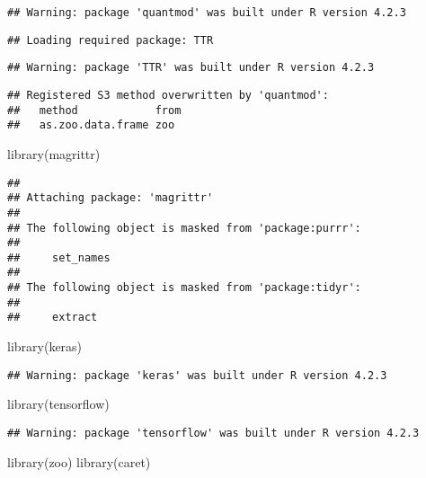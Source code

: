 \documentclass[
]{article}
\newenvironment{Shaded}{\begin{snugshade}}{\end{snugshade}}
\newcommand{\FunctionTok}[1]{\textcolor[rgb]{0.00,0.00,0.00}{#1}}
\newcommand{\NormalTok}[1]{#1}
\begin{document}
\begin{verbatim}
## Warning: package 'quantmod' was built under R version 4.2.3
\end{verbatim}

\begin{verbatim}
## Loading required package: TTR
\end{verbatim}

\begin{verbatim}
## Warning: package 'TTR' was built under R version 4.2.3
\end{verbatim}

\begin{verbatim}
## Registered S3 method overwritten by 'quantmod':
##   method            from
##   as.zoo.data.frame zoo
\end{verbatim}

\begin{Shaded}
\begin{Highlighting}[]
\FunctionTok{library}\NormalTok{(magrittr)}
\end{Highlighting}
\end{Shaded}

\begin{verbatim}
## 
## Attaching package: 'magrittr'
## 
## The following object is masked from 'package:purrr':
## 
##     set_names
## 
## The following object is masked from 'package:tidyr':
## 
##     extract
\end{verbatim}

\begin{Shaded}
\begin{Highlighting}[]
\FunctionTok{library}\NormalTok{(keras)}
\end{Highlighting}
\end{Shaded}

\begin{verbatim}
## Warning: package 'keras' was built under R version 4.2.3
\end{verbatim}

\begin{Shaded}
\begin{Highlighting}[]
\FunctionTok{library}\NormalTok{(tensorflow)}
\end{Highlighting}
\end{Shaded}

\begin{verbatim}
## Warning: package 'tensorflow' was built under R version 4.2.3
\end{verbatim}

\begin{Shaded}
\begin{Highlighting}[]
\FunctionTok{library}\NormalTok{(zoo)}
\FunctionTok{library}\NormalTok{(caret)}
\end{Highlighting}
\end{Shaded}
\end{document}
